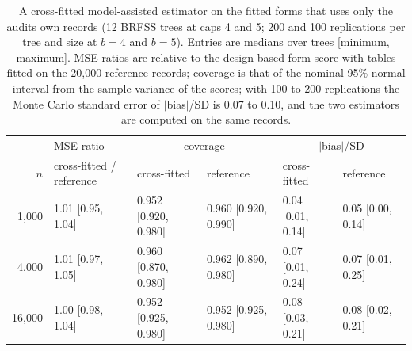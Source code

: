 \begin{table}[h]
\centering
\caption{A cross-fitted model-assisted estimator on the fitted forms that uses only the audit\textquotesingle s own records (12 BRFSS trees at caps 4 and 5; 200 and 100 replications per tree and size at $b=4$ and $b=5$). Entries are medians over trees [minimum, maximum]. MSE ratios are relative to the design-based form score with tables fitted on the 20,000 reference records; coverage is that of the nominal 95\% normal interval from the sample variance of the scores; with 100 to 200 replications the Monte Carlo standard error of $|$bias$|$/SD is 0.07 to 0.10, and the two estimators are computed on the same records.}
\label{tab:aipw}
\footnotesize
\setlength{\tabcolsep}{3pt}
\begin{tabular}{rlllll}
\toprule
 & MSE ratio & \multicolumn{2}{c}{coverage} & \multicolumn{2}{c}{$|$bias$|$/SD} \\
$n$ & cross-fitted / reference & cross-fitted & reference & cross-fitted & reference \\
\midrule
1,000 & 1.01 [0.95, 1.04] & 0.952 [0.920, 0.980] & 0.960 [0.920, 0.990] & 0.04 [0.01, 0.14] & 0.05 [0.00, 0.14] \\
4,000 & 1.01 [0.97, 1.05] & 0.960 [0.870, 0.980] & 0.962 [0.890, 0.980] & 0.07 [0.01, 0.24] & 0.07 [0.01, 0.25] \\
16,000 & 1.00 [0.98, 1.04] & 0.952 [0.925, 0.980] & 0.952 [0.925, 0.980] & 0.08 [0.03, 0.21] & 0.08 [0.02, 0.21] \\
\bottomrule
\end{tabular}
\end{table}
